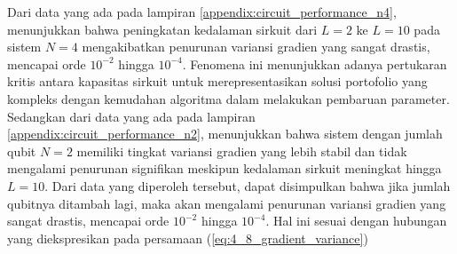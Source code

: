 Dari data yang ada pada lampiran \ref{appendix:circuit_performance_n4}, menunjukkan bahwa peningkatan kedalaman sirkuit dari $L=2$ ke $L=10$ pada sistem $N=4$ mengakibatkan penurunan variansi gradien yang sangat drastis, mencapai orde $10^{-2}$ hingga $10^{-4}$. Fenomena ini menunjukkan adanya pertukaran kritis antara kapasitas sirkuit untuk merepresentasikan solusi portofolio yang kompleks dengan kemudahan algoritma dalam melakukan pembaruan parameter. Sedangkan dari data yang ada pada lampiran \ref{appendix:circuit_performance_n2}, menunjukkan bahwa sistem dengan jumlah qubit $N=2$ memiliki tingkat variansi gradien yang lebih stabil dan tidak mengalami penurunan signifikan meskipun kedalaman sirkuit meningkat hingga $L=10$. Dari data yang diperoleh tersebut, dapat disimpulkan bahwa jika jumlah qubitnya ditambah lagi, maka akan mengalami penurunan variansi gradien yang sangat drastis, mencapai orde $10^{-2}$ hingga $10^{-4}$. Hal ini sesuai dengan hubungan yang diekspresikan pada persamaan (\ref{eq:4_8_gradient_variance})